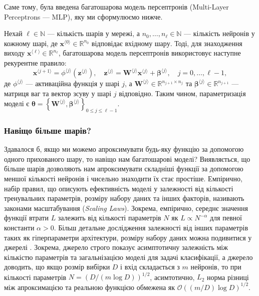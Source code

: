 Саме тому, була введена багатошарова модель персептронів (Multi-Layer
Perceptrons --- MLP), яку ми сформулюємо нижче.
\begin{definition}\label{def:mlp}
	Нехай $\ell \in \mathbb{N}$ --- кількість шарів у мережі, а
	$n_0,\dots,n_{\ell} \in \mathbb{N}$ --- кількість нейронів у кожному шарі,
	де $\mathbf{x}^{\langle 0 \rangle} \in \mathbb{R}^{n_0}$ відповідає вхідному
	шару. Тоді, для знаходження виходу $\mathbf{x}^{\langle \ell \rangle} \in
	\mathbb{R}^{n_{\ell}}$, багатошарова модель персептронів використовує
	наступне рекурентне правило:
	\begin{equation*}
		\mathbf{x}^{\langle j+1 \rangle} = \phi^{\langle j \rangle}(\mathbf{z}^{\langle j \rangle}), \quad \mathbf{z}^{\langle j \rangle} = \boldsymbol{W}^{\langle j \rangle}\mathbf{x}^{\langle j \rangle} + \boldsymbol{\beta}^{\langle j \rangle}, \quad j = 0,\dots,\ell-1,
	\end{equation*}
	де $\phi^{\langle j \rangle}$ --- активаційна функція у шарі $j$, а
	$\boldsymbol{W}^{\langle j \rangle} \in \mathbb{R}^{n_{j+1} \times n_j}$ та
	$\boldsymbol{\beta}^{\langle j \rangle} \in \mathbb{R}^{n_{j+1}}$ ---
	матриця ваг та вектор зсуву у шарі $j$ відповідно. Таким чином,
	параметризація моделі є $\boldsymbol{\theta} =
	\left\{\boldsymbol{W}^{\langle j \rangle},\boldsymbol{\beta}^{\langle j
	\rangle}\right\}_{0 \leq j \leq \ell-1}$.
\end{definition}

\subsubsection{Навіщо більше шарів?}

Здавалося б, якщо ми можемо апроксимувати будь-яку функцію за допомогою одного
прихованого шару, то навіщо нам багатошарові моделі? Виявляється, що більше
шарів дозволяють нам апроксимувати складніші функції за допомогою меншої
кількості нейронів і чисельно знаходити їх стає простіше. Емпірично, набір
правил, що описують ефективність моделі у залежності від кількості тренувальних
параметрів, розміру набору даних та інших факторів, називають законами
масштабування (\textit{Scaling Laws}). Зокрема, емпірично, середнє значення
функції втрати $L$ залежить від кількості параметрів $N$ як $L \propto
N^{-\alpha}$ для певної константи $\alpha>0$. Більш детальне дослідження
залежності від інших параметрів таких як гіперпараметри архітектури, розміру
набору даних можна подивитися у джерелі \cite{scaling}. Зокрема, джерело
\cite{params-generalization} строго показує асимптотичну залежність між
кількістю параметрів та загальнізацією моделі для задачі класифікації, а джерело
\cite{params-generalization-2} доводить, що якщо розмір вибірки $D$ і вхід
складається з $m$ нейронів, то при кількості параметрів $N=(D/(m\log D))^{1/2}$,
асимтотично, $L_2$ норма різниці між апроксимацією та реальною функцією обмежена
як $\mathcal{O}((m/D)\log D)^{1/2}$.

